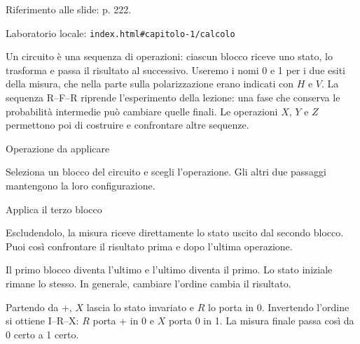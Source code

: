 {\sffamily\small\color{Ink!70} Riferimento alle slide: p. 222.\par}

{\sffamily\small\color{Ink!70} Laboratorio locale: \nolinkurl{index.html#capitolo-1/calcolo}\par}

Un circuito è una sequenza di operazioni: ciascun blocco riceve uno stato, lo trasforma e passa il risultato al successivo. Useremo i nomi 0 e 1 per i due esiti della misura, che nella parte sulla polarizzazione erano indicati con \(H\) e \(V\). La sequenza R--F--R riprende l'esperimento della lezione: una fase che conserva le probabilità intermedie può cambiare quelle finali. Le operazioni \(X\), \(Y\) e \(Z\) permettono poi di costruire e confrontare altre sequenze.\par



Operazione da applicare\par

Seleziona un blocco del circuito e scegli l'operazione. Gli altri due passaggi mantengono la loro configurazione.\par

Applica il terzo blocco\par

Escludendolo, la misura riceve direttamente lo stato uscito dal secondo blocco. Puoi così confrontare il risultato prima e dopo l'ultima operazione.\par

Il primo blocco diventa l'ultimo e l'ultimo diventa il primo. Lo stato iniziale rimane lo stesso. In generale, cambiare l'ordine cambia il risultato.\par

Partendo da +, \(X\) lascia lo stato invariato e \(R\) lo porta in 0. Invertendo l'ordine si ottiene I--R--X: \(R\) porta + in 0 e \(X\) porta 0 in 1. La misura finale passa così da 0 certo a 1 certo.\par


